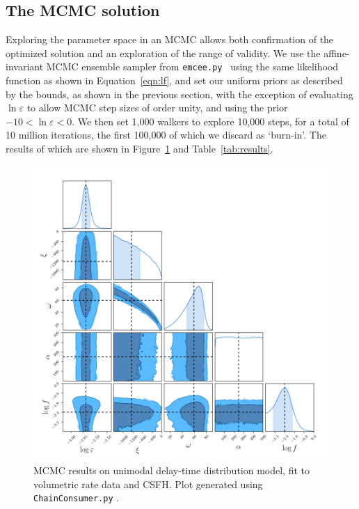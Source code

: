 \documentclass[apj]{aastex62}
\begin{document}
\subsection{The MCMC solution\label{sec:mcmc_sfd}}
Exploring the parameter space in an MCMC allows both confirmation of the optimized solution and an exploration of the range of validity. We use the affine-invariant MCMC ensemble sampler from {\tt emcee.py}~\citep{Foreman-Mackey:2013pd} using the same likelihood function as shown in Equation~\ref{eqn:lf}, and set our uniform priors as described by the bounds, as shown in the previous section, with the exception of evaluating $\ln \varepsilon$ to allow MCMC step sizes of order unity, and using the prior $ -10 < \ln \varepsilon < 0$. We then set 1,000 walkers to explore 10,000 steps, for a total of 10 million iterations, the first 100,000 of which we discard as `burn-in'. The results of which are shown in Figure~\ref{fig:mcmc_sfd} and Table~\ref{tab:results}.

\begin{figure}[t] %
   \centering
   \includegraphics[width=6.5in]{figure_sfd_corners} 
   \caption{\footnotesize MCMC results on unimodal delay-time distribution model, fit to volumetric rate data and CSFH. Plot generated using {\tt ChainConsumer.py} \citep{Hinton:2016qy}.}
   \label{fig:mcmc_sfd}
\end{figure}
\clearpage
\end{document}
